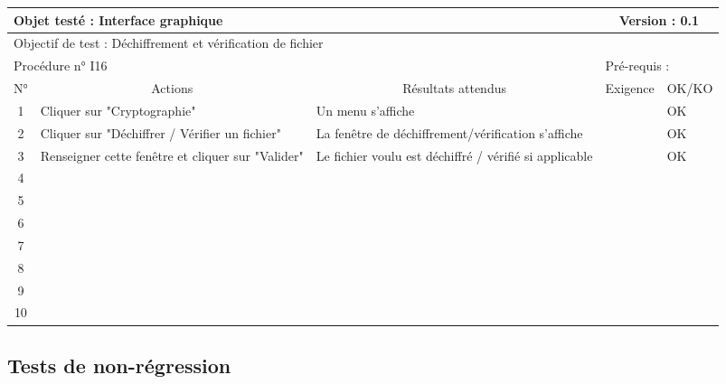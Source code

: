 \documentclass{../res/univ-projet}
\begin{document}
\begin{center}
    \begin{tabular}{|c|p{5cm}|p{5cm}|p{1.5cm}|p{1.5cm}|}
      \hline
      \multicolumn{3}{|l|}{Objet testé : Interface graphique} & \multicolumn{2}{c|}{Version : 0.1}\\ \hline
      \multicolumn{5}{|l|}{Objectif de test : Déchiffrement et vérification de fichier}\\ \hline
      \multicolumn{3}{|l|}{Procédure n° I16} & \multicolumn{2}{p{3cm}|}{Pré-requis : }\\ \hline
      \multicolumn{1}{|c|}{N°} & \multicolumn{1}{c|}{Actions} & \multicolumn{1}{c|}{Résultats attendus} & 
      \multicolumn{1}{c|}{Exigence} & \multicolumn{1}{c|}{OK/KO}\\ \hline
      1 & Cliquer sur "Cryptographie" & Un menu s'affiche &  & OK \\
      2 & Cliquer sur "Déchiffrer / Vérifier un fichier" & La fenêtre de déchiffrement/vérification s'affiche &  & OK\\
      3 & Renseigner cette fenêtre et cliquer sur "Valider" & Le fichier voulu est déchiffré / vérifié si applicable &  & OK\\ 
      4 &  &  &  & \\
      5 &  &  &  & \\
      6 &  &  &  & \\
      7 &  &  &  & \\
      8 &  &  &  & \\
      9 &  &  &  & \\
      10 &  &  &  &\\ 
  \hline
    \end{tabular}
    \vskip 2.2cm

\subsection{Tests de non-régression}


\end{center}
\end{document}
